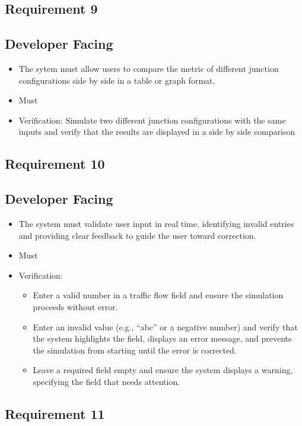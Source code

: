 \documentclass{article}
\begin{document}
\subsection{Requirement 9}
\subsection{Developer Facing}
\begin{itemize}
  \item The sytem must allow users to compare the metric of different junction configurations side by side in a table or graph format.
  \item Must
  \item Verification: Simulate two different junction configurations with the same inputs and verify that the results are displayed in a side by side comparison
\end{itemize}

\subsection{Requirement 10}
\subsection{Developer Facing}
\begin{itemize}
  \item The system must validate user input in real time, identifying invalid entries and providing clear feedback to guide the user toward correction.
  \item Must
  \item Verification:
  \begin{itemize}
      \item Enter a valid number in a traffic flow field and ensure the simulation proceeds without error.
      \item Enter an invalid value (e.g., “abc” or a negative number) and verify that the system highlights the field, displays an error message, and prevents the 
      simulation from starting until the error is corrected.
      \item Leave a required field empty and ensure the system displays a warning, specifying the field that needs attention.
  \end{itemize}
\end{itemize}

\subsection{Requirement 11}
\end{document}
